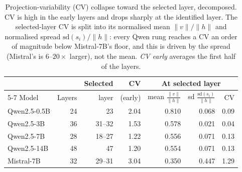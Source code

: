 \begin{table}[t]
  \centering
  \small
  \caption{Projection-variability (CV) collapse toward the selected layer, decomposed.
    CV is high in the early layers and drops sharply at the identified layer. The
    selected-layer CV is split into its normalised mean $\lVert v\rVert/\lVert h\rVert$
    and normalised spread $\mathrm{sd}(s_i)/\lVert h\rVert$: every Qwen rung reaches a CV
    an order of magnitude below Mistral-7B's floor, and this is driven by the spread
    (Mistral's is $6$--$20\times$ larger), not the mean. \emph{CV early} averages the
    first half of the layers.}
  \label{tab:cv_summary}
  \begin{tabular}{lrrrrrr}
    \toprule
    & & Selected & CV & \multicolumn{3}{c}{At selected layer} \\
    \cmidrule(lr){5-7}
    Model & Layers & layer & (early)
          & mean $\tfrac{\lVert v\rVert}{\lVert h\rVert}$
          & sd $\tfrac{\mathrm{sd}(s_i)}{\lVert h\rVert}$
          & CV \\
    \midrule
    Qwen2.5-0.5B & 24 & 23     & 2.04 & 0.810 & 0.068 & 0.09 \\
    Qwen2.5-3B   & 36 & 31--32 & 1.53 & 0.578 & 0.021 & 0.04 \\
    Qwen2.5-7B   & 28 & 18--27 & 1.22 & 0.556 & 0.071 & 0.13 \\
    Qwen2.5-14B  & 48 & 47     & 1.20 & 0.554 & 0.071 & 0.13 \\
    \midrule
    Mistral-7B   & 32 & 29--31 & 3.04 & 0.350 & 0.447 & 1.29 \\
    \bottomrule
  \end{tabular}
\end{table}
